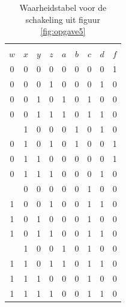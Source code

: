 \documentclass[a4paper,12pt,addpoints,fleqn,dutch]{tisdexam}
\begin{document}
\begin{questions}
\begin{table}[H]
  \caption{Waarheidstabel voor de schakeling uit figuur \ref{fig:opgave5}}
  \label{tab:ant_opgave5b}
    \begin{tabular}{ c c c c | c c c c | c }
      \hline
            &         &         &         &         &         &         &         &       \\ [-2.9ex]
      $w$   &   $x$   &   $y$   &   $z$   &   $a$   &   $b$   &   $c$   &   $d$   & $f$   \\ \hline
       0    &    0    &    0    &    0    &    0    &    0    &    0    &    0    &  1    \\
       0    &    0    &    0    &    1    &    0    &    0    &    0    &    1    &  0    \\
       0    &    0    &    1    &    0    &    1    &    0    &    1    &    0    &  0    \\
       0    &    0    &    1    &    1    &    1    &    0    &    1    &    1    &  0    \\ \hdashline
       0    &    1    &    0    &    0    &    0    &    1    &    0    &    1    &  0    \\
       0    &    1    &    0    &    1    &    0    &    1    &    0    &    0    &  1    \\
       0    &    1    &    1    &    0    &    0    &    0    &    0    &    0    &  1    \\ 
       0    &    1    &    1    &    1    &    0    &    0    &    0    &    1    &  0    \\ \hdashline
       1    &    0    &    0    &    0    &    0    &    0    &    1    &    0    &  0    \\
       1    &    0    &    0    &    1    &    0    &    0    &    1    &    1    &  0    \\
       1    &    0    &    1    &    0    &    0    &    0    &    1    &    0    &  0    \\
       1    &    0    &    1    &    1    &    0    &    0    &    1    &    1    &  0    \\ \hdashline
       1    &    1    &    0    &    0    &    1    &    0    &    1    &    0    &  0    \\
       1    &    1    &    0    &    1    &    1    &    0    &    1    &    1    &  0    \\
       1    &    1    &    1    &    0    &    0    &    0    &    1    &    0    &  0    \\ 
       1    &    1    &    1    &    1    &    0    &    0    &    1    &    1    &  0    \\ \hline
    \end{tabular}
\end{table}


\end{questions}
\end{document}
